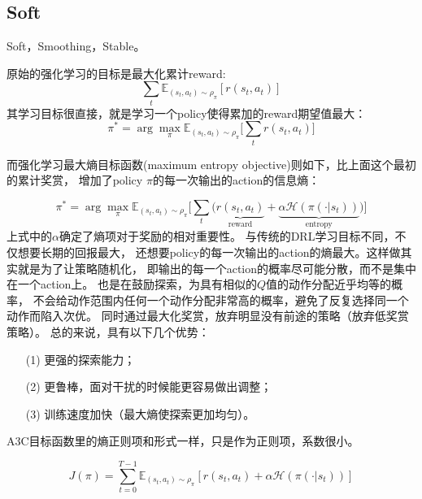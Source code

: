 \subsection{Soft}

Soft，Smoothing，Stable。

原始的强化学习的目标是最大化累计reward:
\begin{equation}\label{rl_objective_function}
\sum_t\mathbb{E}_{(s_t,a_t)\sim\rho_\pi}\left[r(s_t, a_t)\right]
\end{equation}
其学习目标很直接，就是学习一个policy使得累加的reward期望值最大：
\begin{equation}\label{rl_reward_function}
\pi^* = \arg\max_\pi \mathbb{E}_{(s_t,a_t)\sim\rho_\pi}
\Big[ \sum_t r(s_t, a_t) \Big]
\end{equation}

\noindent 而强化学习最大熵目标函数(maximum entropy objective)则如下，比上面这个最初的累计奖赏，
增加了policy $\pi$的每一次输出的action的信息熵：

\begin{equation}\label{maximum_entropy_objective}
\pi^* = \arg\max_\pi \mathbb{E}_{(s_t,a_t)\sim\rho_\pi}
\Big[ \sum_t \big(
\underbrace{r(s_t, a_t)}_{\text{reward}} + 
\underbrace{\alpha \mathcal{H}(\pi(\cdot | s_t))}_{\text{entropy}}
\big)\Big]
\end{equation}
上式中的$\alpha$确定了熵项对于奖励的相对重要性。
与传统的DRL学习目标不同，不仅想要长期的回报最大，
还想要policy的每一次输出的action的熵最大。这样做其实就是为了让策略随机化，
即输出的每一个action的概率尽可能分散，而不是集中在一个action上。
也是在鼓励探索，为具有相似的$Q$值的动作分配近乎均等的概率，
不会给动作范围内任何一个动作分配非常高的概率，避免了反复选择同一个动作而陷入次优。
同时通过最大化奖赏，放弃明显没有前途的策略（放弃低奖赏策略）。
总的来说，具有以下几个优势：
\begin{itemize}
\setlength{\parskip}{0pt}
\item[(1)]
更强的探索能力；
\item[(2)]
更鲁棒，面对干扰的时候能更容易做出调整；
\item[(3)]
训练速度加快（最大熵使探索更加均匀）。
\end{itemize}

A3C目标函数里的熵正则项和形式一样，只是作为正则项，系数很小。

\begin{equation}\label{entropy_of_policy}
J(\pi) = \sum_{t=0}^{T-1} \mathbb{E}_{(s_t,a_t)\sim\rho_\pi}
[r(s_t, a_t) + \alpha \mathcal{H}(\pi(\cdot | s_t))]
\end{equation}


